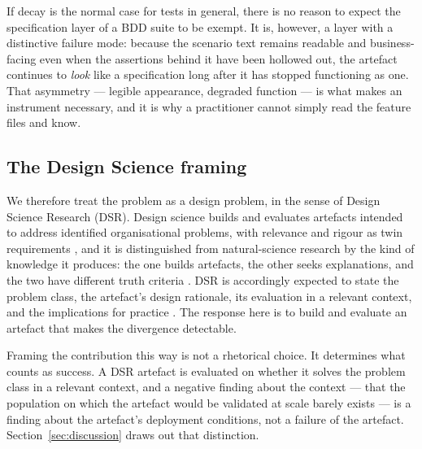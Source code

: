 If decay is the normal case for tests in general, there is no reason to expect the specification layer
of a BDD suite to be exempt. It is, however, a layer with a distinctive failure mode: because the
scenario text remains readable and business-facing even when the assertions behind it have been
hollowed out, the artefact continues to \emph{look} like a specification long after it has stopped
functioning as one. That asymmetry --- legible appearance, degraded function --- is what makes an
instrument necessary, and it is why a practitioner cannot simply read the feature files and know.

\subsection{The Design Science framing}

We therefore treat the problem as a design problem, in the sense of Design Science Research (DSR).
Design science builds and evaluates artefacts intended to address identified organisational problems,
with relevance and rigour as twin requirements \citep{hevner2004design}, and it is distinguished from
natural-science research by the kind of knowledge it produces: the one builds artefacts, the other
seeks explanations, and the two have different truth criteria \citep{march1995design}. DSR is
accordingly expected to state the problem class, the artefact's design rationale, its evaluation in a
relevant context, and the implications for practice \citep{peffers2007dsrm,gregor2013positioning}. The
response here is to build and evaluate an artefact that makes the divergence detectable.

Framing the contribution this way is not a rhetorical choice. It determines what counts as success. A
DSR artefact is evaluated on whether it solves the problem class in a relevant context, and a
negative finding about the context --- that the population on which the artefact would be validated at
scale barely exists --- is a finding about the artefact's deployment conditions, not a failure of the
artefact. Section~\ref{sec:discussion} draws out that distinction.
